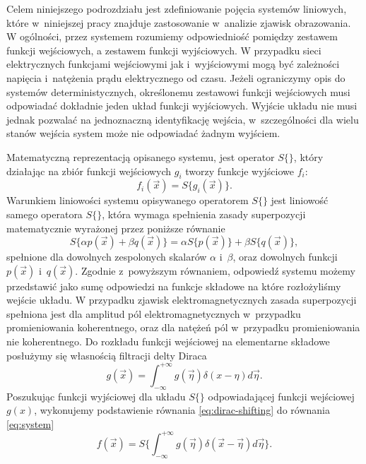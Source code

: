 Celem niniejszego podrozdziału jest zdefiniowanie pojęcia systemów liniowych, które w~niniejszej pracy znajduje zastosowanie w~analizie zjawisk obrazowania. W ogólności, przez systemem rozumiemy odpowiedniość pomiędzy zestawem funkcji wejściowych, a zestawem funkcji wyjściowych. W przypadku sieci elektrycznych funkcjami wejściowymi jak i~wyjściowymi mogą być zależności napięcia i~natężenia prądu elektrycznego od czasu. Jeżeli ograniczymy opis do systemów deterministycznych, określonemu zestawowi funkcji wejściowych musi odpowiadać dokładnie jeden układ funkcji wyjściowych. Wyjście układu nie musi jednak pozwalać na jednoznaczną identyfikację wejścia, w~szczególności dla wielu stanów wejścia system może nie odpowiadać żadnym wyjściem.

\label{art:lsi}

Matematyczną reprezentacją opisanego systemu, jest operator $S\{\}$, który działając na zbiór funkcji wejściowych $g_i$ tworzy funkcje wyjściowe $f_i$:
\begin{equation}
f_i(\vec{x})=S\{g_i(\vec{x})\}.
\label{eq:system}
\end{equation} 
Warunkiem liniowości systemu opisywanego operatorem $S\{\}$ jest liniowość samego operatora $S\{\}$, która wymaga spełnienia zasady superpozycji matematycznie wyrażonej przez poniższe równanie
\begin{equation}
S\{\alpha p(\vec{x}) + \beta q(\vec{x})\} = \alpha S\{p(\vec{x})\} + \beta S\{q(\vec{x})\},
\label{eq:lin-system}
\end{equation}
spełnione dla dowolnych zespolonych skalarów $\alpha$ i~$\beta$, oraz dowolnych funkcji $p(\vec{x})$ i~$q(\vec{x})$. Zgodnie z~powyższym równaniem, odpowiedź systemu możemy przedstawić jako sumę odpowiedzi na funkcje składowe na które rozłożyliśmy wejście układu. W przypadku zjawisk elektromagnetycznych zasada superpozycji spełniona jest dla amplitud pól elektromagnetycznych w~przypadku promieniowania koherentnego, oraz dla natężeń pól w~przypadku promieniowania nie koherentnego. Do rozkładu funkcji wejściowej na elementarne składowe posłużymy się własnością filtracji delty Diraca
\begin{equation}
g(\vec{x})=\int_{-\infty}^{+\infty} g(\vec{\eta}) \delta(x-\eta) d \vec{\eta}.
\label{eq:dirac-shifting}
\end{equation}
Poszukując funkcji wyjściowej dla układu $S\{\}$ odpowiadającej funkcji wejściowej $g(x)$, wykonujemy podstawienie równania \ref{eq:dirac-shifting} do równania \ref{eq:system} 
\begin{equation}
f(\vec{x})=S \{\int_{-\infty}^{+\infty} g(\vec{\eta}) \delta(\vec{x}-\vec{\eta}) d \vec{\eta} \}.
\label{eq:dirac-shift2}
\end{equation}
